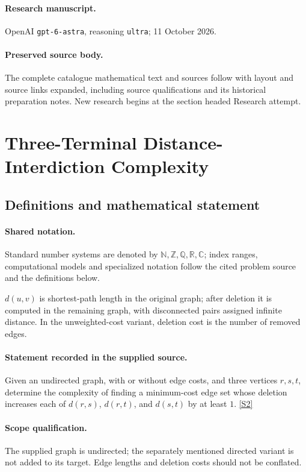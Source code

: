 \documentclass[11pt]{article}
\begin{document}
\paragraph{Research manuscript.} OpenAI \texttt{gpt-6-astra}, reasoning \texttt{ultra}; 11 October 2026.
\paragraph{Preserved source body.} The complete catalogue mathematical text and sources follow with layout and source links expanded, including source qualifications and its historical preparation notes. New research begins at the section headed Research attempt.

\section{Three-Terminal Distance-Interdiction Complexity}\label{statement}

\subsection{Definitions and mathematical statement}

\paragraph{Shared notation.}Standard number systems are denoted by $\mathbb N,\mathbb Z,\mathbb Q,\mathbb R,\mathbb C$; index ranges, computational models and specialized notation follow the cited problem source and the definitions below.


$d(u,v)$ is shortest-path length in the original graph; after deletion it is computed in the remaining graph, with disconnected pairs assigned infinite distance. In the unweighted-cost variant, deletion cost is the number of removed edges.
\paragraph{Statement recorded in the supplied source.}
Given an undirected graph, with or without edge costs, and three vertices $r,s,t$, determine the complexity of finding a minimum-cost edge set whose deletion increases each of $d(r,s)$, $d(r,t)$, and $d(s,t)$ by at least $1$. \href{https://doi.org/10.4171/owr/2005/50}{[S2]}
\paragraph{Scope qualification.}
The supplied graph is undirected; the separately mentioned directed variant is not added to its target. Edge lengths and deletion costs should not be conflated.
\end{document}
